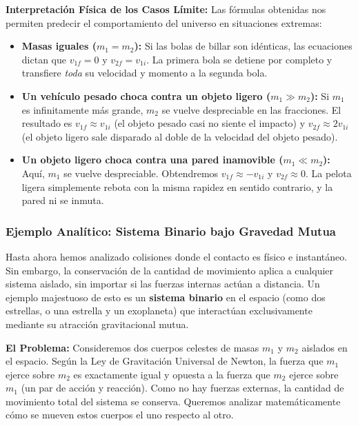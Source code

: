 \documentclass[11pt,a4paper]{book}
\begin{document}
\textbf{Interpretación Física de los Casos Límite:}
Las fórmulas obtenidas nos permiten predecir el comportamiento del universo en situaciones extremas:
\begin{itemize}
    \item \textbf{Masas iguales ($m_1 = m_2$):} Si las bolas de billar son idénticas, las ecuaciones dictan que $v_{1f} = 0$ y $v_{2f} = v_{1i}$. La primera bola se detiene por completo y transfiere \textit{toda} su velocidad y momento a la segunda bola.
    \item \textbf{Un vehículo pesado choca contra un objeto ligero ($m_1 \gg m_2$):} Si $m_1$ es infinitamente más grande, $m_2$ se vuelve despreciable en las fracciones. El resultado es $v_{1f} \approx v_{1i}$ (el objeto pesado casi no siente el impacto) y $v_{2f} \approx 2v_{1i}$ (el objeto ligero sale disparado al doble de la velocidad del objeto pesado).
    \item \textbf{Un objeto ligero choca contra una pared inamovible ($m_1 \ll m_2$):} Aquí, $m_1$ se vuelve despreciable. Obtendremos $v_{1f} \approx -v_{1i}$ y $v_{2f} \approx 0$. La pelota ligera simplemente rebota con la misma rapidez en sentido contrario, y la pared ni se inmuta.
\end{itemize}

\subsubsection{Ejemplo Analítico: Sistema Binario bajo Gravedad Mutua}

Hasta ahora hemos analizado colisiones donde el contacto es físico e instantáneo. Sin embargo, la conservación de la cantidad de movimiento aplica a cualquier sistema aislado, sin importar si las fuerzas internas actúan a distancia. Un ejemplo majestuoso de esto es un \textbf{sistema binario} en el espacio (como dos estrellas, o una estrella y un exoplaneta) que interactúan exclusivamente mediante su atracción gravitacional mutua.

\textbf{El Problema:} Consideremos dos cuerpos celestes de masas $m_1$ y $m_2$ aislados en el espacio. Según la Ley de Gravitación Universal de Newton, la fuerza que $m_1$ ejerce sobre $m_2$ es exactamente igual y opuesta a la fuerza que $m_2$ ejerce sobre $m_1$ (un par de acción y reacción). Como no hay fuerzas externas, la cantidad de movimiento total del sistema se conserva. Queremos analizar matemáticamente cómo se mueven estos cuerpos el uno respecto al otro.
\end{document}
